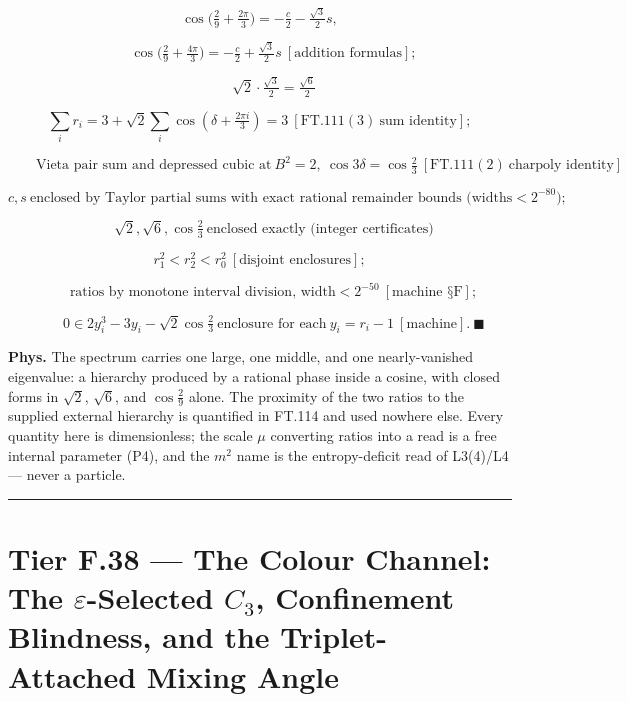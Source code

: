 \begin{theorem}
\[
\cos\bigl(\tfrac29+\tfrac{2\pi}3\bigr)=-\tfrac c2-\tfrac{\sqrt3}2s,
\]

\[
\qquad \cos\bigl(\tfrac29+\tfrac{4\pi}3\bigr)=-\tfrac c2+\tfrac{\sqrt3}2s\ [\text{addition formulas}];
\]

\[
\qquad \sqrt2\cdot\tfrac{\sqrt3}2=\tfrac{\sqrt6}2
\]

\[
\sum_ir_i=3+\sqrt2\sum_i\cos(\delta+\tfrac{2\pi i}3)=3\ [\mathrm{FT.111}(3)\ \text{sum identity}];
\]

\[
\qquad \text{Vieta pair sum and depressed cubic at}\ B^2=2,\ \cos3\delta=\cos\tfrac23\ [\mathrm{FT.111}(2)\ \text{charpoly identity}]
\]

\[
c,s\ \text{enclosed by Taylor partial sums with exact rational remainder bounds (widths}<2^{-80}\text{)};
\]

\[
\qquad \sqrt2,\sqrt6,\cos\tfrac23\ \text{enclosed exactly (integer certificates)}
\]

\[
r_1^2<r_2^2<r_0^2\ [\text{disjoint enclosures}];
\]

\[
\qquad \text{ratios by monotone interval division, width}<2^{-50}\ [\text{machine §F}];
\]

\[
\qquad 0\in 2y_i^3-3y_i-\sqrt2\cos\tfrac23\ \text{enclosure for each}\ y_i=r_i-1\ [\text{machine}].\ \blacksquare
\]

\textbf{Phys.} The spectrum carries one large, one middle, and one nearly-vanished eigenvalue: a hierarchy produced by a rational phase inside a cosine, with closed forms in $\sqrt2$, $\sqrt6$, and $\cos\tfrac29$ alone. The proximity of the two ratios to the supplied external hierarchy is quantified in FT.114 and used nowhere else. Every quantity here is dimensionless; the scale $\mu$ converting ratios into a read is a free internal parameter (P4), and the $m^2$ name is the entropy-deficit read of L3(4)/L4 — never a particle.

\vspace{2pt}\noindent\rule{\textwidth}{0.4pt}\vspace{2pt}

\end{theorem}

\section[Tier F.38 — The Colour Channel: The -Selected , Confinement…]{\texorpdfstring{Tier F.38 — The Colour Channel: The $\varepsilon$-Selected $C_3$, Confinement Blindness, and the Triplet-Attached Mixing Angle}{Tier F.38 - The Colour Channel: The -Selected , Confinement Blindness, and the Triplet-Attached Mixing Angle}}

